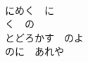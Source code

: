\documentclass[10pt,b5j]{tarticle} %
\begin{document}
\begin{enumerate}
\begin{minipage}[c]{\blocksize}
    \end{minipage}
    \begin{minipage}[c]{\blocksize}
        
        \vspace{\linespace}
        \item~\\
        にめく　に\\
        く　の\\
        とどろかす　のよ\\
        のに　あれや
    
    \end{minipage}
\end{enumerate} %
\end{document}
